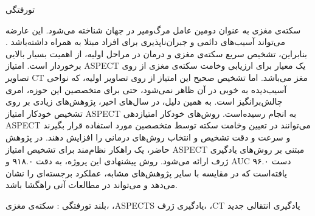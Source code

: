 


‌تورفتگی

سکته‌ی مغزی به عنوان دومین عامل مرگ‌و‌میر در جهان شناخته می‌شود.
این عارضه می‌تواند آسیب‌های دائمی و جبران‌ناپذیری برای افراد مبتلا به همراه داشته‌باشد \cite{donkor2018stroke}.
بنابراین،
تشخیص سریع سکته‌ی مغزی و درمان در مراحل اولیه، از اهمیت بسیار بالایی برخوردار است.
امتیاز ASPECT یک معیار برای ارزیابی وخامت سکته‌ی مغزی از روی تصاویر CT مغز می‌باشد.
اما تشخیص صحیح این امتیاز از روی تصاویر اولیه، که نواحی آسیب‌دیده به خوبی در آن ظاهر نمی‌شود، حتی برای متخصصین این حوزه، امری چالش‌بر‌انگیز است.
به همین دلیل، در سال‌های اخیر، پژوهش‌های زیادی بر روی تشخیص خودکار امتیاز ASPECT به انجام رسیده‌است.
روش‌های خودکار امتیاز‌دهی ASPECT می‌توانند
 در تعیین وخامت سکته توسط متخصصین مورد استفاده قرار بگیرند و سرعت و دقت تشخیص و انتخاب روش‌های درمانی را افزایش دهند.
 در پژوهش حاضر، 
 یک راهکار نظام‌مند برای تشخیص امتیاز ASPECT مبتنی بر روش‌های یادگیری ژرف ارائه می‌شود.
 روش پیشنهادی این پروژه،
 به دقت ۹۱۸.۰ و AUC ۹۶.۰ دست یافته‌است که
 در مقایسه با سایر پژوهش‌های مشابه، عملکرد برجسته‌ای را نشان می‌دهد و
می‌تواند در مطالعات آتی راهگشا باشد.

‌بلند
‌تورفتگی : 
سکته‌ی مغزی، ،ASPECTS یادگیری ژرف، ،CT یادگیری انتقالی
‌جدید
